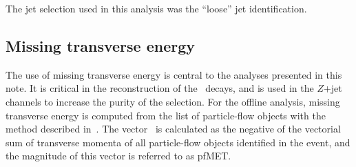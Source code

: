 The jet selection used in this analysis was the ``loose'' jet
identification. 


\subsection{Missing transverse energy}

The use of missing transverse energy is central to the analyses presented in this
note.  It is critical in the reconstruction of the \WtoLN\ decays, and
is used in the $Z$+jet channels to increase the purity of the selection.
 For the offline analysis, missing transverse 
energy is computed from the list of particle-flow objects with the method described 
in~\cite{CMS-PAS-JME-10-003}.  The vector \VEtmiss\ is calculated as the negative of 
the vectorial sum of transverse momenta of all particle-flow objects identified in the 
event, and the magnitude of this vector is referred to as pfMET.  

